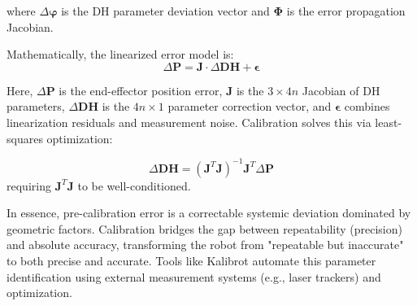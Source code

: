 \documentclass[conference]{IEEEtran}
\begin{document}
where $\Delta \mathbf{\varphi}$ is the DH parameter deviation vector and $\mathbf{\Phi}$ is the error propagation Jacobian.  


Mathematically, the linearized error model is:  
\begin{equation}
    \Delta \mathbf{P} = \mathbf{J} \cdot \Delta \mathbf{DH} + \mathbf{\epsilon}
\end{equation}

Here, $\Delta \mathbf{P}$ is the end-effector position error, $\mathbf{J}$ is the $3 \times 4n$ Jacobian of DH parameters, $\Delta \mathbf{DH}$ is the $4n \times 1$ parameter correction vector, and $\mathbf{\epsilon}$ combines linearization residuals and measurement noise. Calibration solves this via least-squares optimization:  

\begin{equation}
    \Delta \mathbf{DH} = (\mathbf{J}^T \mathbf{J})^{-1} \mathbf{J}^T \Delta \mathbf{P}
\end{equation}
requiring $\mathbf{J}^T\mathbf{J}$ to be well-conditioned.  

In essence, pre-calibration error is a correctable systemic deviation dominated by geometric factors. Calibration bridges the gap between repeatability (precision) and absolute accuracy, transforming the robot from "repeatable but inaccurate" to both precise and accurate. Tools like Kalibrot automate this parameter identification using external measurement systems (e.g., laser trackers) and optimization.
\end{document}
